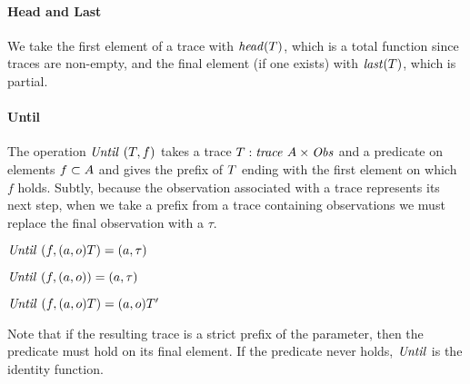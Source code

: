 \documentclass[acmsmall,review,anonymous]{acmart}\settopmatter{printfolios=true,printccs=false,printacmref=false}
\begin{document}
\paragraph*{Head and Last}

We take the first element of a trace with \(\mathit{head}(T)\), which is a total
function since traces are non-empty, and the final element (if one exists) with
\(\mathit{last}(T)\), which is partial.

\paragraph*{Until}
The operation \(\mathit{Until}~(T,f)\)
takes a trace
\(T : \mathit{trace} ~ A \times \mathit{Obs}\) and a predicate
on elements \(f \subset A\) and gives the prefix of
\(T\) ending with the first element on which \(f\) holds.
Subtly, because the observation associated with a trace represents its
next step, when we take a prefix from a trace containing observations
we must replace the final observation with a \(\tau\).

  \begin{center}
  \begin{minipage}{.3\textwidth}
             {\(\mathit{Until}~(f,(a,o)T) = (a,\tau)\)}
  \end{minipage}
%
  \begin{minipage}{.3\textwidth}
  \judgment{}
           {\(\mathit{Until}~(f,(a,o)) = (a,\tau)\)}
%
  \end{minipage}
  \begin{minipage}{.3\textwidth}
              {\(\mathit{Until}~(f,(a,o)T) = (a,o)T'\)}
  \end{minipage}
  \end{center}
%
Note that if the resulting trace is a strict prefix of the parameter, then the
predicate must hold on its final element. If the predicate never holds,
\(\mathit{Until}\) is the identity function.

\end{document}
